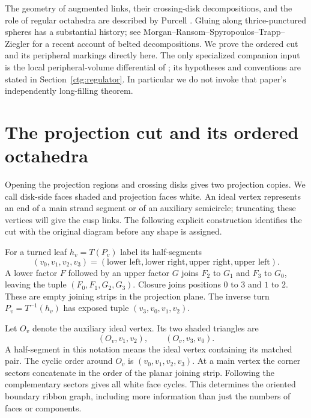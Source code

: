 \documentclass[11pt]{article}
\numberwithin{equation}{section}
\theoremstyle{definition}
\theoremstyle{remark}
\begin{document}
The geometry of augmented links, their crossing-disk decompositions,
and the role of regular octahedra are described by Purcell
\cite{Purcell}. Gluing along thrice-punctured spheres has a substantial
history; see Morgan--Ransom--Spyropoulos--Trapp--Ziegler
\cite{BeltedSums} for a recent account of belted decompositions.
We prove the ordered cut and its peripheral markings directly here.
The only specialized companion input is the local peripheral-volume
differential of \cite[Section~7, equation~(7.3)]{MarkedFillings};
its hypotheses and conventions are stated in
Section~\ref{ctg:regulator}. In particular we do not invoke that
paper's independently long-filling theorem.

\section{The projection cut and its ordered octahedra}
\label{ctg:topology}

Opening the projection regions and crossing disks gives two projection
copies. We call disk-side faces shaded and projection faces white.
An ideal vertex represents an end of a main strand segment or of an
auxiliary semicircle; truncating these vertices will give the cusp
links. The following explicit construction identifies the cut
with the original diagram before any shape is assigned.

For a turned leaf $h_v=T(P_v)$ label its half-segments
\[
 (v_0,v_1,v_2,v_3)
  =(\text{lower left},\text{lower right},\text{upper right},\text{upper left}).
\]
A lower factor $F$ followed by an upper factor $G$ joins $F_2$ to
$G_1$ and $F_3$ to $G_0$, leaving the tuple $(F_0,F_1,G_2,G_3)$.
Closure joins positions $0$ to $3$ and $1$ to $2$. These are empty
joining strips in the projection plane. The inverse turn
$P_v=T^{-1}(h_v)$ has exposed tuple $(v_3,v_0,v_1,v_2)$.

Let $O_v$ denote the auxiliary ideal vertex. Its two shaded triangles
are
\begin{equation}\label{ctg:leaf-faces}
 (O_v,v_1,v_2),\qquad (O_v,v_3,v_0).
\end{equation}
A half-segment in this notation means the ideal vertex containing its
matched pair. The cyclic order around $O_v$ is $(v_0,v_1,v_2,v_3)$.
At a main vertex the corner sectors concatenate in the order of the
planar joining strip. Following the complementary sectors gives all
white face cycles. This determines the oriented boundary ribbon graph,
including more information than just the numbers of faces or components.
\end{document}
